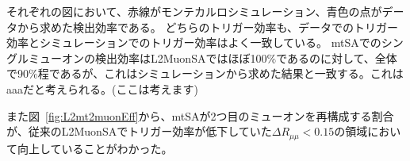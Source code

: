 それぞれの図において、赤線がモンテカルロシミュレーション、青色の点がデータから求めた検出効率である。
どちらのトリガー効率も、データでのトリガー効率とシミュレーションでのトリガー効率はよく一致している。
mtSAでのシングルミューオンの検出効率はL2MuonSAではほぼ100$\%$であるのに対して、全体で90$\%$程であるが、これはシミュレーションから求めた結果と一致する。これはaaaだと考えられる。(ここは考えます)

また図~\ref{fig:L2mt2muonEff}から、mtSAが2つ目のミューオンを再構成する割合が、従来のL2MuonSAでトリガー効率が低下していた$\Delta R_{\mu\mu}<0.15$の領域において向上していることがわかった。

